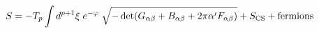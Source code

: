 \begin{equation}
S = - T_p  \int d^{p + 1} \xi
\;e^{-\varphi} \;\sqrt{-\det (G_{\alpha \beta} + B_{\alpha \beta} + 2 \pi \alpha'
F_{\alpha \beta})  }   + S_{{\rm CS}}+{\rm fermions}
\label{eq:DBI}
\end{equation}

